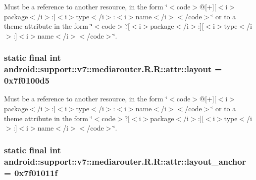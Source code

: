 Must be a reference to another resource, in the form \char`\"{}$<$code$>$@\mbox{[}+\mbox{]}\mbox{[}$<$i$>$package$<$/i$>$:\mbox{]}$<$i$>$type$<$/i$>$:$<$i$>$name$<$/i$>$$<$/code$>$\char`\"{} or to a theme attribute in the form \char`\"{}$<$code$>$?\mbox{[}$<$i$>$package$<$/i$>$:\mbox{]}\mbox{[}$<$i$>$type$<$/i$>$:\mbox{]}$<$i$>$name$<$/i$>$$<$/code$>$\char`\"{}. \hypertarget{classandroid_1_1support_1_1v7_1_1mediarouter_1_1_r_1_1attr_811c9ef0aa74194b976ff5473ac65bde}{
\subsubsection[{layout}]{\setlength{\rightskip}{0pt plus 5cm}static final int android::support::v7::mediarouter.R.R::attr::layout = 0x7f0100d5}}
\label{classandroid_1_1support_1_1v7_1_1mediarouter_1_1_r_1_1attr_811c9ef0aa74194b976ff5473ac65bde}


Must be a reference to another resource, in the form \char`\"{}$<$code$>$@\mbox{[}+\mbox{]}\mbox{[}$<$i$>$package$<$/i$>$:\mbox{]}$<$i$>$type$<$/i$>$:$<$i$>$name$<$/i$>$$<$/code$>$\char`\"{} or to a theme attribute in the form \char`\"{}$<$code$>$?\mbox{[}$<$i$>$package$<$/i$>$:\mbox{]}\mbox{[}$<$i$>$type$<$/i$>$:\mbox{]}$<$i$>$name$<$/i$>$$<$/code$>$\char`\"{}. \hypertarget{classandroid_1_1support_1_1v7_1_1mediarouter_1_1_r_1_1attr_ce18c2eb30d1e499d9fba993d9383887}{
\subsubsection[{layout\_\-anchor}]{\setlength{\rightskip}{0pt plus 5cm}static final int android::support::v7::mediarouter.R.R::attr::layout\_\-anchor = 0x7f01011f}}
\label{classandroid_1_1support_1_1v7_1_1mediarouter_1_1_r_1_1attr_ce18c2eb30d1e499d9fba993d9383887}


